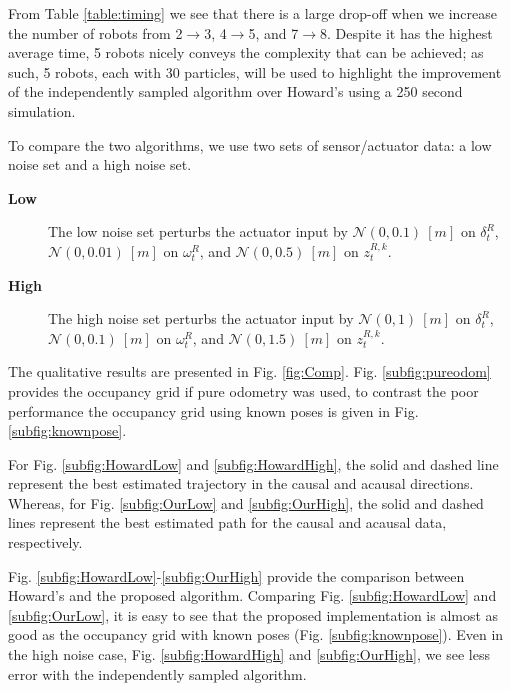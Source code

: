 From Table \ref{table:timing} we see that there is a large drop-off when we increase the number of robots from 2$\rightarrow$3, 4$\rightarrow$5, and 7$\rightarrow$8.  Despite it has the highest average time, 5 robots nicely conveys the complexity that can be achieved; as such, 5 robots, each with 30 particles, will be used to highlight the improvement of the independently sampled algorithm over Howard's using a 250 second simulation.  

To compare the two algorithms, we use two sets of sensor/actuator data: a low noise set and a high noise set. 
\begin{description}
\item[\textbf{Low}] The low noise set perturbs the actuator input by $\mathcal{N}(0,0.1)\ [m]$ on $\delta_t^{R}$, $\mathcal{N}(0,0.01)\ [m]$ on $\omega_t^{R}$, and $\mathcal{N}(0,0.5)\ [m]$ on $z_t^{R,k}$.  
\item[\textbf{High}] The high noise set perturbs the actuator input by $\mathcal{N}(0,1)\ [m]$ on $\delta_t^{R}$, $\mathcal{N}(0,0.1)\ [m]$ on $\omega_t^{R}$, and $\mathcal{N}(0,1.5)\ [m]$ on $z_t^{R,k}$.
\end{description}

The qualitative results are presented in Fig. \ref{fig:Comp}.  Fig. \ref{subfig:pureodom} provides the occupancy grid if pure odometry was used, to contrast the poor performance the occupancy grid using known poses is given in Fig. \ref{subfig:knownpose}.

For Fig. \ref{subfig:HowardLow} and \ref{subfig:HowardHigh}, the solid and dashed line represent the best estimated trajectory in the causal and acausal directions.  Whereas, for Fig. \ref{subfig:OurLow} and \ref{subfig:OurHigh}, the solid and dashed lines represent the best estimated path for the causal and acausal data, respectively.

Fig. \ref{subfig:HowardLow}-\ref{subfig:OurHigh} provide the comparison between Howard's and the proposed algorithm.  Comparing Fig. \ref{subfig:HowardLow} and \ref{subfig:OurLow}, it is easy to see that the proposed implementation is almost as good as the occupancy grid with known poses (Fig. \ref{subfig:knownpose}).  Even in the high noise case, Fig. \ref{subfig:HowardHigh} and \ref{subfig:OurHigh}, we see less error with the independently sampled algorithm.  

